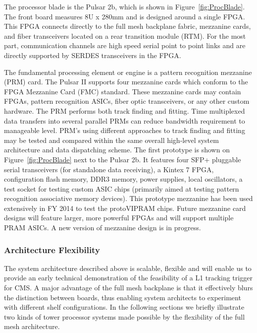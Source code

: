 \noindent The processor blade is the Pulsar 2b, which is shown in Figure~\ref{fig:ProcBlade}.  The front board measures 8U x 280mm and is designed around a single FPGA.  This FPGA connects directly to the full mesh backplane fabric, mezzanine cards, and fiber transceivers located on a rear transition module (RTM).  For the most part, communication channels are high speed serial point to point links and are directly supported by SERDES transceivers in the FPGA. 

\noindent The fundamental processing element or engine is a pattern recognition mezzanine (PRM) card. 
The Pulsar II supports four mezzanine cards which conform to the FPGA Mezzanine Card (FMC) standard. These mezzanine cards may contain FPGAs, pattern recognition ASICs, fiber optic transceivers, or any other custom hardware. The PRM performs both track finding and fitting. Time multiplexed data transfers into several parallel PRMs can reduce bandwidth requirement to manageable level.  PRM's using different approaches to track finding and fitting may be tested and compared within the same overall high-level system architecture and data dispatching scheme. The first prototype is shown on Figure~\ref{fig:ProcBlade} next to the Pulsar 2b.  It features four SFP+ pluggable serial transceivers (for standalone data receiving), a Kintex 7 FPGA, configuration flash memory, DDR3 memory, power supplies, local oscillators, a test socket for testing custom ASIC chips (primarily aimed at testing pattern recognition associative memory devices). This prototype mezzanine has been used extensively in FY 2014 to test the protoVIPRAM chips. Future mezzanine card designs will feature larger, more powerful FPGAs and will support multiple PRAM ASICs.  A new version of mezzanine design is in progress. 


\subsubsection{Architecture Flexibility}

\noindent

The system architecture described above is scalable, flexible and will enable us to provide an early technical demonstration of the feasibility of a L1 tracking trigger for CMS. A major advantage of the full mesh backplane is that it effectively blurs the distinction between boards, thus enabling system architects to experiment with different shelf configurations.  In the following sections we briefly illustrate two kinds of tower processor systems made possible by the flexibility of the full mesh architecture.

